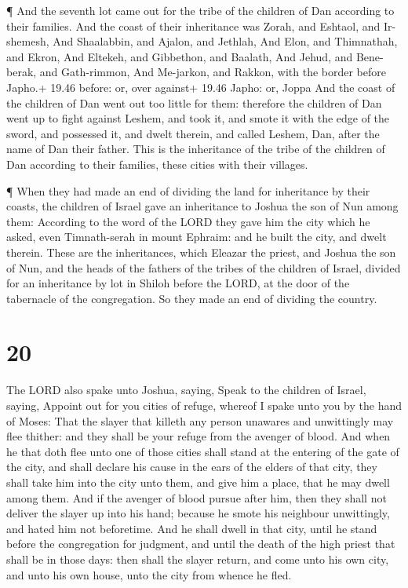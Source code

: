  ¶ And the seventh lot came out for the tribe of the
children of Dan according to their families.  And the coast
of their inheritance was Zorah, and Eshtaol, and Ir-shemesh,
 And Shaalabbin, and Ajalon, and Jethlah,  And
Elon, and Thimnathah, and Ekron,  And Eltekeh, and
Gibbethon, and Baalath,  And Jehud, and Bene-berak, and
Gath-rimmon,  And Me-jarkon, and Rakkon, with the border
before Japho.+ 19.46 before: or, over against+ 19.46 Japho: or, Joppa
 And the coast of the children of Dan went out too little
for them: therefore the children of Dan went up to fight against Leshem,
and took it, and smote it with the edge of the sword, and possessed it,
and dwelt therein, and called Leshem, Dan, after the name of Dan their
father.  This is the inheritance of the tribe of the
children of Dan according to their families, these cities with their
villages.

 ¶ When they had made an end of dividing the land for
inheritance by their coasts, the children of Israel gave an inheritance
to Joshua the son of Nun among them:  According to the word
of the LORD they gave him the city which he asked, even Timnath-serah in
mount Ephraim: and he built the city, and dwelt therein. 
These are the inheritances, which Eleazar the priest, and Joshua the son
of Nun, and the heads of the fathers of the tribes of the children of
Israel, divided for an inheritance by lot in Shiloh before the LORD, at
the door of the tabernacle of the congregation. So they made an end of
dividing the country.

\hypertarget{section-19}{%
\section{20}\label{section-19}}

 The LORD also spake unto Joshua, saying,  Speak
to the children of Israel, saying, Appoint out for you cities of refuge,
whereof I spake unto you by the hand of Moses:  That the
slayer that killeth any person unawares and unwittingly may flee
thither: and they shall be your refuge from the avenger of blood.
 And when he that doth flee unto one of those cities shall
stand at the entering of the gate of the city, and shall declare his
cause in the ears of the elders of that city, they shall take him into
the city unto them, and give him a place, that he may dwell among them.
 And if the avenger of blood pursue after him, then they
shall not deliver the slayer up into his hand; because he smote his
neighbour unwittingly, and hated him not beforetime.  And he
shall dwell in that city, until he stand before the congregation for
judgment, and until the death of the high priest that shall be in those
days: then shall the slayer return, and come unto his own city, and unto
his own house, unto the city from whence he fled.

